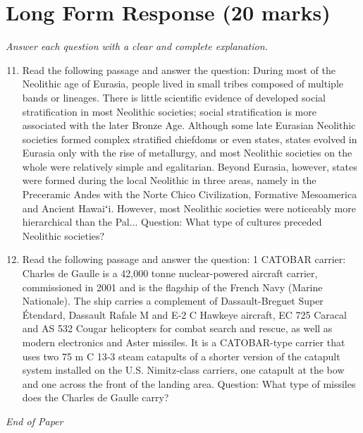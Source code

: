\documentclass[12pt]{article}
\begin{document}
\section*{Long Form Response (20 marks)}
\textit{Answer each question with a clear and complete explanation.}
\begin{enumerate}[label=\arabic*.]
\setcounter{enumi}{10}
\item Read the following passage and answer the question: During most of the Neolithic age of Eurasia, people lived in small tribes composed of multiple bands or lineages. There is little scientific evidence of developed social stratification in most Neolithic societies; social stratification is more associated with the later Bronze Age. Although some late Eurasian Neolithic societies formed complex stratified chiefdoms or even states, states evolved in Eurasia only with the rise of metallurgy, and most Neolithic societies on the whole were relatively simple and egalitarian. Beyond Eurasia, however, states were formed during the local Neolithic in three areas, namely in the Preceramic Andes with the Norte Chico Civilization, Formative Mesoamerica and Ancient Hawaiʻi. However, most Neolithic societies were noticeably more hierarchical than the Pal... Question: What type of cultures preceded Neolithic societies?
\item Read the following passage and answer the question: 1 CATOBAR carrier: Charles de Gaulle is a 42,000 tonne nuclear-powered aircraft carrier, commissioned in 2001 and is the flagship of the French Navy (Marine Nationale). The ship carries a complement of Dassault-Breguet Super Étendard, Dassault Rafale M and E‑2 C Hawkeye aircraft, EC 725 Caracal and AS 532 Cougar helicopters for combat search and rescue, as well as modern electronics and Aster missiles. It is a CATOBAR-type carrier that uses two 75 m C 13‑3 steam catapults of a shorter version of the catapult system installed on the U.S. Nimitz-class carriers, one catapult at the bow and one across the front of the landing area. Question: What type of missiles does the Charles de Gaulle carry?
\end{enumerate}

\vfill
\noindent\textit{End of Paper}
\end{document}
